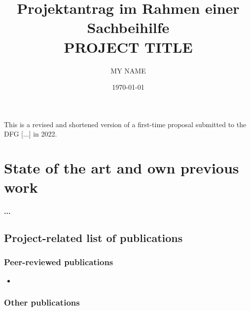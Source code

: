 \documentclass[a4paper,11pt]{article} %
\begin{document}
\title{{\small Projektantrag im Rahmen einer Sachbeihilfe}\\{\bf \LARGE PROJECT TITLE}}
\author{MY NAME}
\date{\today}
\maketitle

\noindent This is a revised and shortened version of a first-time proposal submitted to the DFG [...] in 2022.

\section{State of the art and own previous work}
\paragraph{...}

\subsection{Project-related list of publications}

\subsubsection{Peer-reviewed publications}



\begin{itemize}
  \item {}
\end{itemize}

\subsubsection{Other publications}
\end{document}
